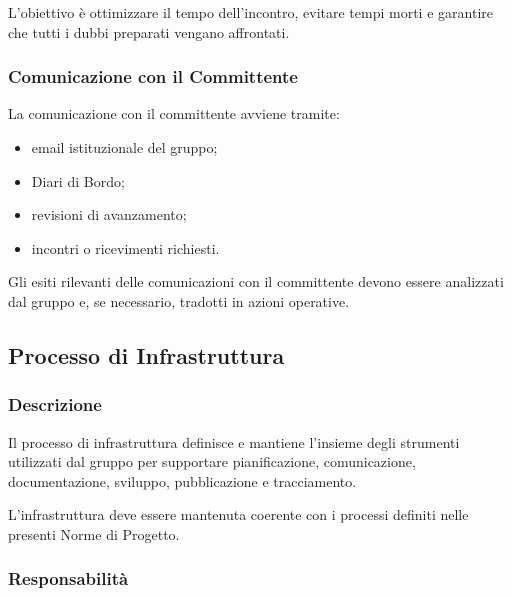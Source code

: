 L'obiettivo è ottimizzare il tempo dell'incontro, evitare tempi morti e garantire
che tutti i dubbi preparati vengano affrontati.


\subsubsection{Comunicazione con il Committente}

La comunicazione con il committente avviene tramite:

\begin{itemize}
    \item email istituzionale del gruppo;
    \item Diari di Bordo;
    \item revisioni di avanzamento;
    \item incontri o ricevimenti richiesti.
\end{itemize}

Gli esiti rilevanti delle comunicazioni con il committente devono essere analizzati
dal gruppo e, se necessario, tradotti in azioni operative.


\subsection{Processo di Infrastruttura}
\label{sec:infrastruttura}

\subsubsection{Descrizione}

Il processo di infrastruttura definisce e mantiene l'insieme degli strumenti
utilizzati dal gruppo per supportare pianificazione, comunicazione, documentazione,
sviluppo, pubblicazione e tracciamento.

L'infrastruttura deve essere mantenuta coerente con i processi definiti nelle
presenti Norme di Progetto.


\subsubsection{Responsabilità}

